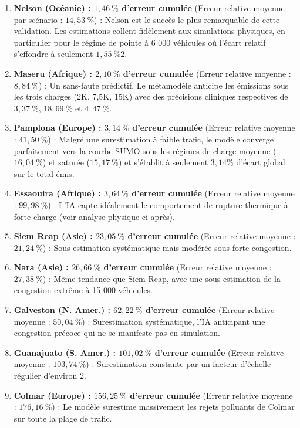 \documentclass[10pt, a4paper]{article}
\providecommand{\tightlist}{}
\begin{document}
\begin{enumerate}
\def\labelenumi{\arabic{enumi}.}
\tightlist
\item
  \textbf{Nelson (Océanie) : \(1,46\ \%\) d'erreur cumulée} (Erreur
  relative moyenne par scénario : \(14,53\ \%\)) : Nelson est le succès
  le plus remarquable de cette validation. Les estimations collent
  fidèlement aux simulations physiques, en particulier pour le régime de
  pointe à 6 000 véhicules où l'écart relatif s'effondre à seulement
  \(1,55\ \%2\).
\item
  \textbf{Maseru (Afrique) : \(2,10\ \%\) d'erreur cumulée} (Erreur
  relative moyenne : \(8,84\ \%\)) : Un sans-faute prédictif. Le
  métamodèle anticipe les émissions sous les trois charges (2K, 7,5K,
  15K) avec des précisions cliniques respectives de \(3,37\ \%\),
  \(18,69\ \%\) et \(4,47\ \%\).
\item
  \textbf{Pamplona (Europe) : \(3,14\ \%\) d'erreur cumulée} (Erreur
  relative moyenne : \(41,50\ \%\)) : Malgré une surestimation à faible
  trafic, le modèle converge parfaitement vers la courbe SUMO sous les
  régimes de charge moyenne (\(16,04\ \%\)) et saturée (\(15,17\ \%\))
  et s'établit à seulement \(3,14\%\) d'écart global sur le total émis.
\item
  \textbf{Essaouira (Afrique) : \(3,64\ \%\) d'erreur cumulée} (Erreur
  relative moyenne : \(99,98\ \%\)) : L'IA capte idéalement le
  comportement de rupture thermique à forte charge (voir analyse
  physique ci-après).
\item
  \textbf{Siem Reap (Asie) : \(23,05\ \%\) d'erreur cumulée} (Erreur
  relative moyenne : \(21,24\ \%\)) : Sous-estimation systématique mais
  modérée sous forte congestion.
\item
  \textbf{Nara (Asie) : \(26,66\ \%\) d'erreur cumulée} (Erreur relative
  moyenne : \(27,38\ \%\)) : Même tendance que Siem Reap, avec une
  sous-estimation de la congestion extrême à 15 000 véhicules.
\item
  \textbf{Galveston (N. Amer.) : \(62,22\ \%\) d'erreur cumulée} (Erreur
  relative moyenne : \(50,04\ \%\)) : Surestimation systématique, l'IA
  anticipant une congestion précoce qui ne se manifeste pas en
  simulation.
\item
  \textbf{Guanajuato (S. Amer.) : \(101,02\ \%\) d'erreur cumulée}
  (Erreur relative moyenne : \(103,74\ \%\)) : Surestimation constante
  par un facteur d'échelle régulier d'environ 2.
\item
  \textbf{Colmar (Europe) : \(156,25\ \%\) d'erreur cumulée} (Erreur
  relative moyenne : \(176,16\ \%\)) : Le modèle surestime massivement
  les rejets polluants de Colmar sur toute la plage de trafic.
\end{enumerate}
\end{document}
